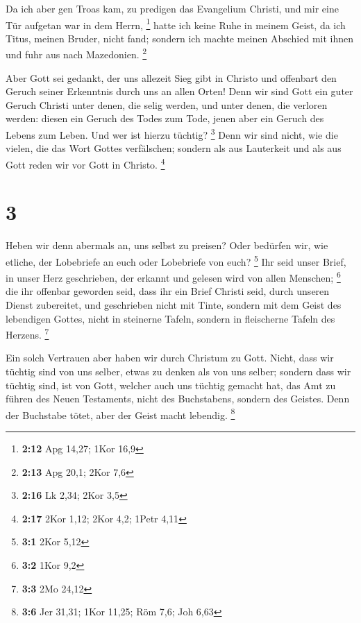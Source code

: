  Da ich aber gen Troas kam, zu predigen das Evangelium
Christi, und mir eine Tür aufgetan war in dem Herrn, \footnote{\textbf{2:12}
  Apg 14,27; 1Kor 16,9}  hatte ich keine Ruhe in meinem
Geist, da ich Titus, meinen Bruder, nicht fand; sondern ich machte
meinen Abschied mit ihnen und fuhr aus nach Mazedonien. \footnote{\textbf{2:13}
  Apg 20,1; 2Kor 7,6}

 Aber Gott sei gedankt, der uns allezeit Sieg gibt in
Christo und offenbart den Geruch seiner Erkenntnis durch uns an allen
Orten!  Denn wir sind Gott ein guter Geruch Christi unter
denen, die selig werden, und unter denen, die verloren werden:
 diesen ein Geruch des Todes zum Tode, jenen aber ein
Geruch des Lebens zum Leben. Und wer ist hierzu tüchtig? \footnote{\textbf{2:16}
  Lk 2,34; 2Kor 3,5}  Denn wir sind nicht, wie die
vielen, die das Wort Gottes verfälschen; sondern als aus Lauterkeit und
als aus Gott reden wir vor Gott in Christo. \footnote{\textbf{2:17} 2Kor
  1,12; 2Kor 4,2; 1Petr 4,11}

\hypertarget{section-1}{%
\section{3}\label{section-1}}

 Heben wir denn abermals an, uns selbst zu preisen? Oder
bedürfen wir, wie etliche, der Lobebriefe an euch oder Lobebriefe von
euch? \footnote{\textbf{3:1} 2Kor 5,12}  Ihr seid unser
Brief, in unser Herz geschrieben, der erkannt und gelesen wird von allen
Menschen; \footnote{\textbf{3:2} 1Kor 9,2}  die ihr
offenbar geworden seid, dass ihr ein Brief Christi seid, durch unseren
Dienst zubereitet, und geschrieben nicht mit Tinte, sondern mit dem
Geist des lebendigen Gottes, nicht in steinerne Tafeln, sondern in
fleischerne Tafeln des Herzens. \footnote{\textbf{3:3} 2Mo 24,12}

 Ein solch Vertrauen aber haben wir durch Christum zu
Gott.  Nicht, dass wir tüchtig sind von uns selber, etwas
zu denken als von uns selber; sondern dass wir tüchtig sind, ist von
Gott,  welcher auch uns tüchtig gemacht hat, das Amt zu
führen des Neuen Testaments, nicht des Buchstabens, sondern des Geistes.
Denn der Buchstabe tötet, aber der Geist macht lebendig. \footnote{\textbf{3:6}
  Jer 31,31; 1Kor 11,25; Röm 7,6; Joh 6,63}

